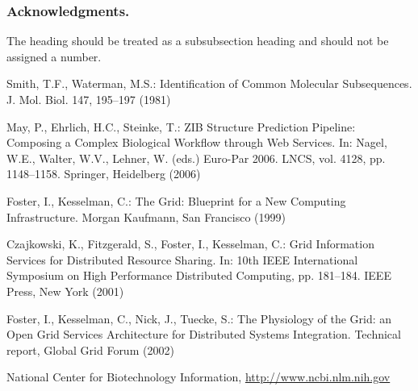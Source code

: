 \documentclass[runningheads,a4paper]{llncs}
\begin{document}
\subsubsection*{Acknowledgments.} The heading should be treated as a
subsubsection heading and should not be assigned a number.

\begin{thebibliography}{4}

 Smith, T.F., Waterman, M.S.: Identification of Common Molecular
Subsequences. J. Mol. Biol. 147, 195--197 (1981)

 May, P., Ehrlich, H.C., Steinke, T.: ZIB Structure Prediction Pipeline:
Composing a Complex Biological Workflow through Web Services. In: Nagel,
W.E., Walter, W.V., Lehner, W. (eds.) Euro-Par 2006. LNCS, vol. 4128,
pp. 1148--1158. Springer, Heidelberg (2006)

 Foster, I., Kesselman, C.: The Grid: Blueprint for a New Computing
Infrastructure. Morgan Kaufmann, San Francisco (1999)

 Czajkowski, K., Fitzgerald, S., Foster, I., Kesselman, C.: Grid
Information Services for Distributed Resource Sharing. In: 10th IEEE
International Symposium on High Performance Distributed Computing, pp.
181--184. IEEE Press, New York (2001)

 Foster, I., Kesselman, C., Nick, J., Tuecke, S.: The Physiology of the
Grid: an Open Grid Services Architecture for Distributed Systems
Integration. Technical report, Global Grid Forum (2002)

 National Center for Biotechnology Information, \url{http://www.ncbi.nlm.nih.gov}

\end{thebibliography}
\end{document}
